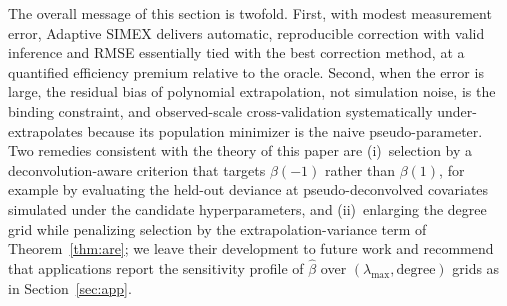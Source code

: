The overall message of this section is twofold. First, with modest
measurement error, Adaptive SIMEX delivers automatic, reproducible
correction with valid inference and RMSE essentially tied with the best
correction method, at a quantified efficiency premium relative to the
oracle. Second, when the error is large, the residual bias of
polynomial extrapolation, not simulation noise, is the binding
constraint, and observed-scale cross-validation systematically
under-extrapolates because its population minimizer is the naive
pseudo-parameter. Two remedies consistent with the theory of this paper
are (i)~selection by a deconvolution-aware criterion that targets
$\beta(-1)$ rather than $\beta(1)$, for example by evaluating the
held-out deviance at pseudo-deconvolved covariates simulated under the
candidate hyperparameters, and (ii)~enlarging the degree grid while
penalizing selection by the extrapolation-variance term of
Theorem~\ref{thm:are}; we leave their development to future work and
recommend that applications report the sensitivity profile of
$\hat\beta$ over $(\lambda_{\max},\text{degree})$ grids as in
Section~\ref{sec:app}.

